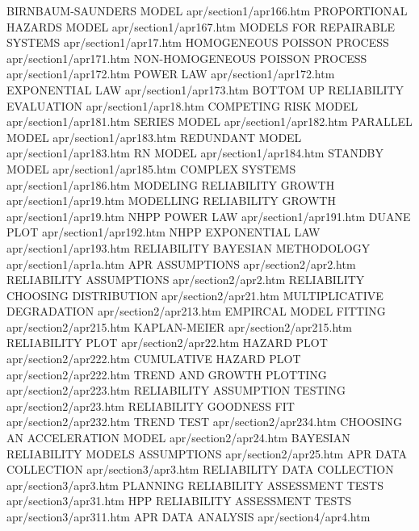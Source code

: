 BIRNBAUM-SAUNDERS MODEL                 apr/section1/apr166.htm
PROPORTIONAL HAZARDS MODEL              apr/section1/apr167.htm
MODELS FOR REPAIRABLE SYSTEMS           apr/section1/apr17.htm
HOMOGENEOUS POISSON PROCESS             apr/section1/apr171.htm
NON-HOMOGENEOUS POISSON PROCESS         apr/section1/apr172.htm
POWER LAW                               apr/section1/apr172.htm
EXPONENTIAL LAW                         apr/section1/apr173.htm
BOTTOM UP RELIABILITY EVALUATION        apr/section1/apr18.htm
COMPETING RISK MODEL                    apr/section1/apr181.htm
SERIES MODEL                            apr/section1/apr182.htm
PARALLEL MODEL                          apr/section1/apr183.htm
REDUNDANT MODEL                         apr/section1/apr183.htm
RN MODEL                                apr/section1/apr184.htm
STANDBY MODEL                           apr/section1/apr185.htm
COMPLEX SYSTEMS                         apr/section1/apr186.htm
MODELING RELIABILITY GROWTH             apr/section1/apr19.htm
MODELLING RELIABILITY GROWTH            apr/section1/apr19.htm
NHPP POWER LAW                          apr/section1/apr191.htm
DUANE PLOT                              apr/section1/apr192.htm
NHPP EXPONENTIAL LAW                    apr/section1/apr193.htm
RELIABILITY BAYESIAN METHODOLOGY        apr/section1/apr1a.htm
APR ASSUMPTIONS                         apr/section2/apr2.htm
RELIABILITY ASSUMPTIONS                 apr/section2/apr2.htm
RELIABILITY CHOOSING DISTRIBUTION       apr/section2/apr21.htm
MULTIPLICATIVE DEGRADATION              apr/section2/apr213.htm
EMPIRCAL MODEL FITTING                  apr/section2/apr215.htm
KAPLAN-MEIER                            apr/section2/apr215.htm
RELIABILITY PLOT                        apr/section2/apr22.htm
HAZARD PLOT                             apr/section2/apr222.htm
CUMULATIVE HAZARD PLOT                  apr/section2/apr222.htm
TREND AND GROWTH PLOTTING               apr/section2/apr223.htm
RELIABILITY ASSUMPTION TESTING          apr/section2/apr23.htm
RELIABILITY GOODNESS FIT                apr/section2/apr232.htm
TREND TEST                              apr/section2/apr234.htm
CHOOSING AN ACCELERATION MODEL          apr/section2/apr24.htm
BAYESIAN RELIABILITY MODELS ASSUMPTIONS apr/section2/apr25.htm
APR DATA COLLECTION                     apr/section3/apr3.htm
RELIABILITY DATA COLLECTION             apr/section3/apr3.htm
PLANNING RELIABILITY ASSESSMENT TESTS   apr/section3/apr31.htm
HPP RELIABILITY ASSESSMENT TESTS        apr/section3/apr311.htm
APR DATA ANALYSIS                       apr/section4/apr4.htm

